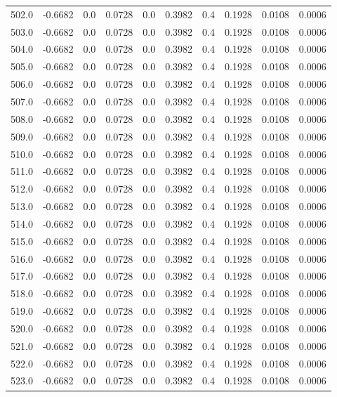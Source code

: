 \begin{longtable}{lrrrrrrrrr}
502.0 & -0.6682 & 0.0 & 0.0728 & 0.0 & 0.3982 & 0.4 & 0.1928 & 0.0108 & 0.0006 \\
503.0 & -0.6682 & 0.0 & 0.0728 & 0.0 & 0.3982 & 0.4 & 0.1928 & 0.0108 & 0.0006 \\
504.0 & -0.6682 & 0.0 & 0.0728 & 0.0 & 0.3982 & 0.4 & 0.1928 & 0.0108 & 0.0006 \\
505.0 & -0.6682 & 0.0 & 0.0728 & 0.0 & 0.3982 & 0.4 & 0.1928 & 0.0108 & 0.0006 \\
506.0 & -0.6682 & 0.0 & 0.0728 & 0.0 & 0.3982 & 0.4 & 0.1928 & 0.0108 & 0.0006 \\
507.0 & -0.6682 & 0.0 & 0.0728 & 0.0 & 0.3982 & 0.4 & 0.1928 & 0.0108 & 0.0006 \\
508.0 & -0.6682 & 0.0 & 0.0728 & 0.0 & 0.3982 & 0.4 & 0.1928 & 0.0108 & 0.0006 \\
509.0 & -0.6682 & 0.0 & 0.0728 & 0.0 & 0.3982 & 0.4 & 0.1928 & 0.0108 & 0.0006 \\
510.0 & -0.6682 & 0.0 & 0.0728 & 0.0 & 0.3982 & 0.4 & 0.1928 & 0.0108 & 0.0006 \\
511.0 & -0.6682 & 0.0 & 0.0728 & 0.0 & 0.3982 & 0.4 & 0.1928 & 0.0108 & 0.0006 \\
512.0 & -0.6682 & 0.0 & 0.0728 & 0.0 & 0.3982 & 0.4 & 0.1928 & 0.0108 & 0.0006 \\
513.0 & -0.6682 & 0.0 & 0.0728 & 0.0 & 0.3982 & 0.4 & 0.1928 & 0.0108 & 0.0006 \\
514.0 & -0.6682 & 0.0 & 0.0728 & 0.0 & 0.3982 & 0.4 & 0.1928 & 0.0108 & 0.0006 \\
515.0 & -0.6682 & 0.0 & 0.0728 & 0.0 & 0.3982 & 0.4 & 0.1928 & 0.0108 & 0.0006 \\
516.0 & -0.6682 & 0.0 & 0.0728 & 0.0 & 0.3982 & 0.4 & 0.1928 & 0.0108 & 0.0006 \\
517.0 & -0.6682 & 0.0 & 0.0728 & 0.0 & 0.3982 & 0.4 & 0.1928 & 0.0108 & 0.0006 \\
518.0 & -0.6682 & 0.0 & 0.0728 & 0.0 & 0.3982 & 0.4 & 0.1928 & 0.0108 & 0.0006 \\
519.0 & -0.6682 & 0.0 & 0.0728 & 0.0 & 0.3982 & 0.4 & 0.1928 & 0.0108 & 0.0006 \\
520.0 & -0.6682 & 0.0 & 0.0728 & 0.0 & 0.3982 & 0.4 & 0.1928 & 0.0108 & 0.0006 \\
521.0 & -0.6682 & 0.0 & 0.0728 & 0.0 & 0.3982 & 0.4 & 0.1928 & 0.0108 & 0.0006 \\
522.0 & -0.6682 & 0.0 & 0.0728 & 0.0 & 0.3982 & 0.4 & 0.1928 & 0.0108 & 0.0006 \\
523.0 & -0.6682 & 0.0 & 0.0728 & 0.0 & 0.3982 & 0.4 & 0.1928 & 0.0108 & 0.0006 \\

\end{longtable}
